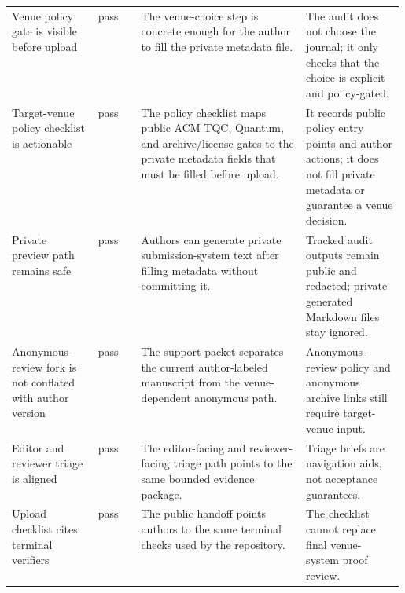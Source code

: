 \begin{tabularx}{\linewidth}{>{\raggedright\arraybackslash}p{0.22\linewidth}>{\raggedright\arraybackslash}p{0.11\linewidth}>{\raggedright\arraybackslash}X>{\raggedright\arraybackslash}p{0.25\linewidth}}
Venue policy gate is visible before upload & pass & The venue-choice step is concrete enough for the author to fill the private metadata file. & The audit does not choose the journal; it only checks that the choice is explicit and policy-gated. \\
Target-venue policy checklist is actionable & pass & The policy checklist maps public ACM TQC, Quantum, and archive/license gates to the private metadata fields that must be filled before upload. & It records public policy entry points and author actions; it does not fill private metadata or guarantee a venue decision. \\
Private preview path remains safe & pass & Authors can generate private submission-system text after filling metadata without committing it. & Tracked audit outputs remain public and redacted; private generated Markdown files stay ignored. \\
Anonymous-review fork is not conflated with author version & pass & The support packet separates the current author-labeled manuscript from the venue-dependent anonymous path. & Anonymous-review policy and anonymous archive links still require target-venue input. \\
Editor and reviewer triage is aligned & pass & The editor-facing and reviewer-facing triage path points to the same bounded evidence package. & Triage briefs are navigation aids, not acceptance guarantees. \\
Upload checklist cites terminal verifiers & pass & The public handoff points authors to the same terminal checks used by the repository. & The checklist cannot replace final venue-system proof review. \\
\bottomrule
\end{tabularx}
